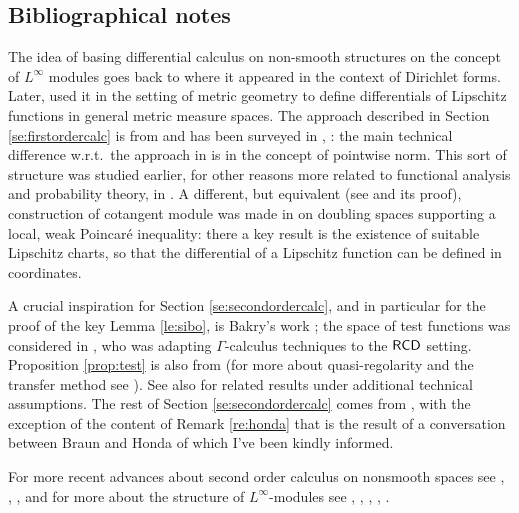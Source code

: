 \documentclass[11pt]{article}
\numberwithin{equation}{section}
\newcommand{\RCD}{{\sf RCD}}
\begin{document}
\subsection{Bibliographical notes}


{\footnotesize The idea of basing differential calculus on non-smooth structures on the concept of $L^\infty$ modules goes back to   \cite{Sauvageot89,Sauvageot90} where it appeared in the context of Dirichlet forms. Later, \cite{Weaver01} used it in the setting of metric geometry to define differentials of Lipschitz functions in general metric measure spaces. The approach described in Section \ref{se:firstordercalc} is from \cite{Gigli14} and has been surveyed in  \cite{Gigli17}, \cite{GP19}: the main technical difference w.r.t.\ the approach in \cite{Weaver01}  is in the concept of pointwise norm. This sort of structure was studied earlier, for other reasons more related to functional analysis and probability theory, in \cite{HLR91}. A different, but equivalent (see \cite[Corollary 2.5.2]{Gigli14} and its proof), construction of cotangent module was made in \cite{Cheeger00} on doubling spaces supporting a local, weak Poincar\'e inequality: there a key result is the existence of suitable Lipschitz charts, so that the differential of a Lipschitz function can be defined in coordinates.



A crucial inspiration for Section \ref{se:secondordercalc}, and in particular for the proof of the key Lemma \ref{le:sibo}, is Bakry's work \cite{Bakry83}; the space of test functions was considered  in \cite{Savare13}, who was  adapting $\Gamma$-calculus techniques to the $\RCD$ setting.  Proposition \ref{prop:test} is also  from  \cite{Savare13} (for more about quasi-regolarity and the transfer method see \cite[Chapters IV, VI]{MaRockner92}). See also \cite{Sturm14} for related results under additional technical assumptions. The rest of Section  \ref{se:secondordercalc} comes from  \cite{Gigli14}, with the exception of the content of Remark \ref{re:honda} that is the result of a conversation between Braun and Honda of which I've been kindly informed. 

For more recent advances about second order calculus on nonsmooth spaces see \cite{Han14}, \cite{Br21}, \cite{Braun22}, \cite{HS22} and for more about the structure of $L^\infty$-modules see \cite{LP18}, \cite{P19}, \cite{DMLP21}, \cite{LPV22}, \cite{GLP22}.

}
\end{document}
